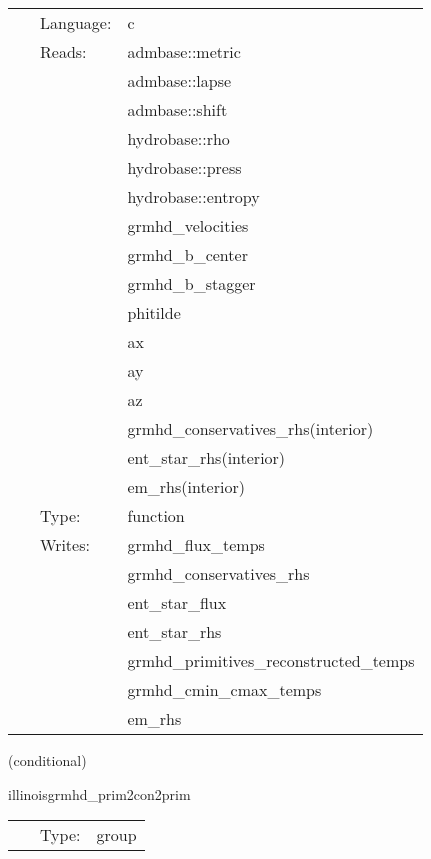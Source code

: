 \documentclass{article}
\begin{document}
 \begin{tabular*}{160mm}{cll} 
~ & Language:  & c \\ 
~ & Reads:  & admbase::metric \\ 
~& ~ &admbase::lapse\\ 
~& ~ &admbase::shift\\ 
~& ~ &hydrobase::rho\\ 
~& ~ &hydrobase::press\\ 
~& ~ &hydrobase::entropy\\ 
~& ~ &grmhd\_velocities\\ 
~& ~ &grmhd\_b\_center\\ 
~& ~ &grmhd\_b\_stagger\\ 
~& ~ &phitilde\\ 
~& ~ &ax\\ 
~& ~ &ay\\ 
~& ~ &az\\ 
~& ~ &grmhd\_conservatives\_rhs(interior)\\ 
~& ~ &ent\_star\_rhs(interior)\\ 
~& ~ &em\_rhs(interior)\\ 
~ & Type:  & function \\ 
~ & Writes:  & grmhd\_flux\_temps \\ 
~& ~ &grmhd\_conservatives\_rhs\\ 
~& ~ &ent\_star\_flux\\ 
~& ~ &ent\_star\_rhs\\ 
~& ~ &grmhd\_primitives\_reconstructed\_temps\\ 
~& ~ &grmhd\_cmin\_cmax\_temps\\ 
~& ~ &em\_rhs\\ 
\end{tabular*} 


\vspace{5mm}

   (conditional) 

\hspace{5mm} illinoisgrmhd\_prim2con2prim 

\hspace{5mm}{\it convert hydrobase initial data to illinoisgrmhd variables } 


\hspace{5mm}

 \begin{tabular*}{160mm}{cll} 
~ & Type:  & group \\ 
\end{tabular*} 
\end{document}
